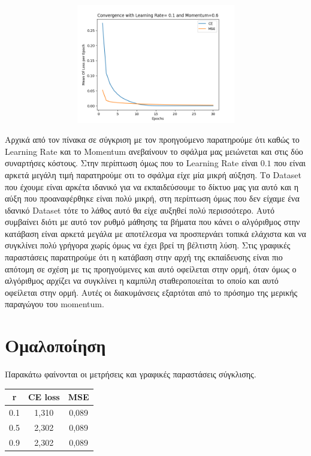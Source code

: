 \documentclass[12pt,a4paper]{article}
\newcommand{\tl}{\textlatin}
\begin{document}
        \begin{figure}[h]
            \raggedright
            \begin{subfigure}[t]{0.5\textwidth}
               \includegraphics[width=10cm,height=5.2cm,left]{images/0.1_0.6.png}
            \end{subfigure}
        \end{figure}
        Αρχικά από τον πίνακα σε σύγκριση με τον προηγούμενο παρατηρούμε ότι καθώς το \tl{Learning Rate} και το \tl{Momentum} ανεβαίνουν το σφάλμα μας μειώνεται και στις δύο συναρτήσες κόστους. Στην περίπτωση όμως που το \tl{Learning Rate} είναι $0.1$ που είναι αρκετά μεγάλη τιμή παρατηρούμε οτι το σφάλμα είχε μία μικρή αύξηση. Το \tl{Dataset} που έχουμε είναι αρκέτα ιδανικό για να εκπαιδεύσουμε το δίκτυο μας για αυτό και η αύξη που προαναφέρθηκε είναι πολύ μικρή, στη περίπτωση όμως που δεν είχαμε ένα ιδανικό \tl{Dataset} τότε το λάθος αυτό θα είχε αυξηθεί πολύ περισσότερο. Αυτό συμβαίνει διότι με αυτό τον ρυθμό μάθησης τα βήματα που κάνει ο αλγόριθμος στην κατάβαση είναι αρκετά μεγάλα με αποτέλεσμα να προσπερνάει τοπικά ελάχιστα και να συγκλίνει πολύ γρήγορα χωρίς όμως να έχει βρεί τη βέλτιστη λύση. Στις γραφικές παραστάσεις παρατηρούμε ότι η κατάβαση στην αρχή της εκπαίδευσης είναι πιο απότομη σε σχέση με τις προηγούμενες και αυτό οφείλεται στην ορμή, όταν όμως ο αλγόριθμος αρχίζει να συγκλίνει η καμπύλη σταθεροποιείται το οποίο και αυτό οφείλεται στην ορμή. Αυτές οι διακυμάνσεις εξαρτόται από το πρόσημο της μερικής παραγώγου του \tl{momentum}.

    \section{Ομαλοποίηση}
        Παρακάτω φαίνονται οι μετρήσεις και γραφικές παραστάσεις σύγκλισης.
        \begin{table}[h]
            \centering
            \begin{tabular}{|c | c | c | }
                \hline
                \tl{r}  & \tl{CE loss} & \tl{MSE} \\
                \hline
                0.1  & 1,310 & 0,089 \\ 
                0.5  & 2,302 & 0,089 \\ 
                0.9   & 2,302 & 0,089 \\ 
                \hline 
            \end{tabular} 
        \end{table}
\end{document}
